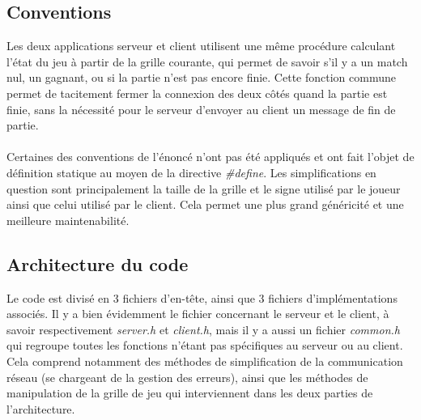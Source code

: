 \documentclass[a4paper]{article}
\begin{document}
\subsection{Conventions}
Les deux applications serveur et client utilisent une même procédure calculant l'état du jeu à partir de la grille courante,
qui permet de savoir s'il y a un match nul, un gagnant, ou si la partie n'est pas encore finie.
Cette fonction commune permet de tacitement fermer la connexion des deux côtés quand la partie est finie,
sans la nécessité pour le serveur d'envoyer au client un message de fin de partie.
\paragraph{}
Certaines des conventions de l'énoncé n'ont pas été appliqués et ont fait l'objet de définition statique
au moyen de la directive \textit{\#define}. Les simplifications en question sont principalement la taille
de la grille et le signe utilisé par le joueur ainsi que celui utilisé par le client. Cela permet une
plus grand généricité et une meilleure maintenabilité.
\subsection{Architecture du code}
Le code est divisé en 3 fichiers d'en-tête, ainsi que 3 fichiers d'implémentations associés.
Il y a bien évidemment le fichier concernant le serveur et le client, à savoir respectivement \textit{server.h} et \textit{client.h},
mais il y a aussi un fichier \textit{common.h} qui regroupe toutes les fonctions n'étant pas spécifiques au serveur ou au client.
Cela comprend notamment des méthodes de simplification de la communication réseau (se chargeant de la gestion des erreurs),
ainsi que les méthodes de manipulation de la grille de jeu qui interviennent dans les deux parties de l'architecture.
\end{document}
